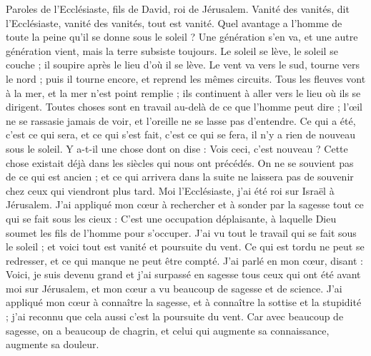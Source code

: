 \BFont
\begin{multicols}{2}
\VerseOne{}Paroles de l'Ecclésiaste, fils de David, roi de Jérusalem.
Vanité des vanités, dit l'Ecclésiaste, vanité des vanités, tout est vanité.
Quel avantage a l'homme de toute la peine qu’il se donne sous le soleil ?
Une génération s’en va, et une autre génération vient, mais la terre subsiste toujours.
Le soleil se lève, le soleil se couche ; il soupire après le lieu d'où il se lève.
Le vent va vers le sud, tourne vers le nord ; puis il tourne encore, et reprend les mêmes circuits.
Tous les fleuves vont à la mer, et la mer n’est point remplie ; ils continuent à aller vers le lieu où ils se dirigent.
Toutes choses sont en travail au-delà de ce que l'homme peut dire ; l'œil ne se rassasie jamais de voir, et l'oreille ne se lasse pas d'entendre.
Ce qui a été, c'est ce qui sera, et ce qui s’est fait, c’est ce qui se fera, il n'y a rien de nouveau sous le soleil.
Y a-t-il une chose dont on dise : Vois ceci, c’est nouveau ? Cette chose existait déjà dans les siècles qui nous ont précédés.
On ne se souvient pas de ce qui est ancien ; et ce qui arrivera dans la suite ne laissera pas de souvenir chez ceux qui viendront plus tard.
Moi l'Ecclésiaste, j'ai été roi sur Israël à Jérusalem.
J'ai appliqué mon cœur à rechercher et à sonder par la sagesse tout ce qui se fait sous les cieux : C’est une occupation déplaisante, à laquelle Dieu soumet les fils de l’homme pour s’occuper.
J'ai vu tout le travail qui se fait sous le soleil ; et voici tout est vanité et poursuite du vent.
Ce qui est tordu ne peut se redresser, et ce qui manque ne peut être compté.
J'ai parlé en mon cœur, disant : Voici, je suis devenu grand et j’ai surpassé en sagesse tous ceux qui ont été avant moi sur Jérusalem, et mon cœur a vu beaucoup de sagesse et de science.
J'ai appliqué mon cœur à connaître la sagesse, et à connaître la sottise et la stupidité ; j'ai reconnu que cela aussi c’est la poursuite du vent.
Car avec beaucoup de sagesse, on a beaucoup de chagrin, et celui qui augmente sa connaissance, augmente sa douleur.

\end{multicols}
